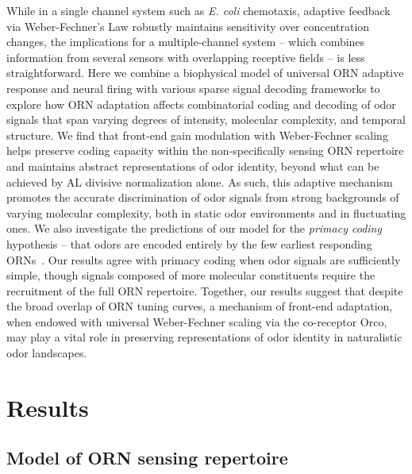 \documentclass[9pt,twocolumn,twoside,lineno]{pnas-new}
\begin{document}
While in a single channel system such as \textit{E. coli} chemotaxis, adaptive feedback via Weber-Fechner's Law robustly maintains sensitivity over concentration changes, the implications for a multiple-channel system -- which combines information from several sensors with overlapping receptive fields  -- is less straightforward. Here we combine a biophysical model of universal ORN adaptive response and neural firing with various sparse signal decoding frameworks to explore how ORN adaptation affects combinatorial coding and decoding of odor signals that span varying degrees of intensity, molecular complexity, and temporal structure. We find that front-end gain modulation with Weber-Fechner scaling helps preserve coding capacity within the non-specifically sensing ORN repertoire and maintains abstract representations of odor identity, beyond what can be achieved by AL divisive normalization alone. As such, this adaptive mechanism promotes the accurate  discrimination of odor signals from strong backgrounds of varying molecular complexity, both in static odor environments and in fluctuating ones. We also investigate the predictions of our model for the \textit{primacy coding} hypothesis  -- that odors are encoded entirely by the few earliest responding ORNs~\cite{primacy_coding, primacy_math}. Our results agree with primacy coding when odor signals are sufficiently simple, though signals composed of more molecular constituents require the recruitment of the full ORN repertoire. Together, our results suggest that despite the broad overlap of ORN tuning curves, a mechanism of front-end adaptation, when endowed with universal Weber-Fechner scaling via the co-receptor Orco, may play a vital role in preserving representations of odor identity in naturalistic odor landscapes.




\section{Results}






\subsection{Model of ORN sensing repertoire}
\end{document}

